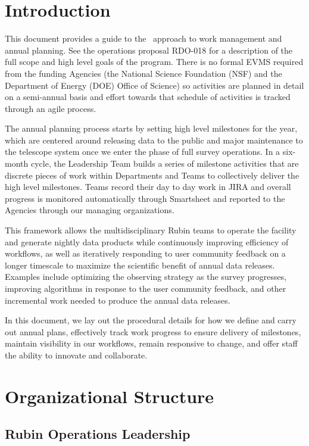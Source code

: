 \section{Introduction}

This document provides a guide to the \VRO\ approach to work management and annual planning.
See the operations proposal RDO-018 for a description of the full scope and high level goals of the program.
There is no formal \gls{EVMS} required from the funding Agencies (the National Science Foundation (NSF) and the Department of Energy (DOE) Office of Science) so activities are planned in detail on a semi-annual basis and effort towards that schedule of activities is tracked through an agile process.

The annual planning process starts by setting high level milestones for the year, which are centered around releasing data to the public and major maintenance to the telescope system once we enter the phase of full survey operations.   
In a six-month cycle, the Leadership Team builds a series of milestone activities that are discrete pieces of work within Departments and Teams to collectively deliver the high level milestones.  
Teams record their day to day work in \gls{JIRA} and overall progress is monitored automatically through Smartsheet and reported to the Agencies through our managing organizations.

This framework allows the multidisciplinary Rubin teams to operate the facility and generate nightly data products while continuously improving efficiency of workflows,
as well as iteratively responding to user community feedback on a longer timescale to maximize the scientific benefit of annual data releases.
Examples include optimizing the observing strategy as the survey progresses, improving algorithms in response to the user community feedback, 
and other incremental work needed to produce the annual data releases.

In this document, we lay out the procedural details for how we define and carry out annual plans, effectively track work progress to ensure delivery of milestones, maintain visibility in our workflows, remain responsive to change, and offer staff the ability to innovate and collaborate.


\section{Organizational Structure}
\label{sec:structure}


\subsection{Rubin Operations Leadership}
\label{sec:contacts}

